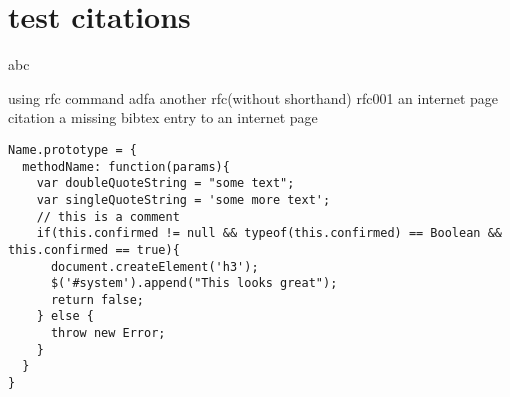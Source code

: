 \documentclass[
a4paper, 11pt,
toc=bibliography,
chapterprefix=true, numbers=noenddot,%
DIV=15,BCOR=4mm,headinclude=true,footinclude=false
]{scrbook}
\newcommand{\rfc}[1]{{\cite{rfc#1}}}
\begin{document}
\comment
\chapter{test citations}
abc\cite{Doyle.2001}

using rfc command\rfc{5766}
adfa\cite{rfc5766}
another rfc(without shorthand)\cite{rfc2}
rfc001\cite{rfc1}
an internet page citation\cite{Bry2005}
a missing bibtex entry to an internet page\cite{thz_ne}
\comment
\endcomment

\comment
\begin{lstlisting}[caption=My Javascript Example]
Name.prototype = {
  methodName: function(params){
    var doubleQuoteString = "some text";
    var singleQuoteString = 'some more text';
    // this is a comment
    if(this.confirmed != null && typeof(this.confirmed) == Boolean && this.confirmed == true){
      document.createElement('h3');
      $('#system').append("This looks great");
      return false;
    } else {
      throw new Error;
    }
  }
}
\end{lstlisting}
\endcomment



\end{document}
